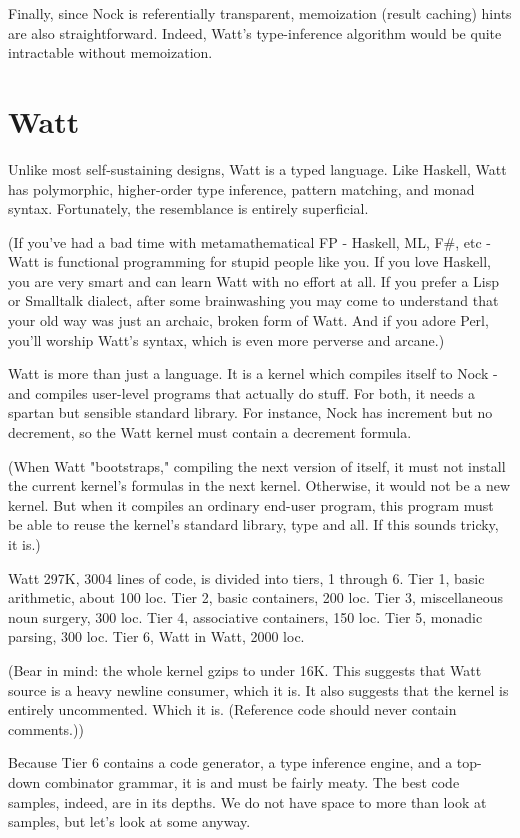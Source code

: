 \documentclass[10pt, nocopyrightspace]{sigplanconf}
\begin{document}
Finally, since Nock is referentially transparent, memoization
(result caching) hints are also straightforward.  Indeed, Watt's
type-inference algorithm would be quite intractable without
memoization.  

\section{Watt}

Unlike most self-sustaining designs, Watt is a typed language.
Like Haskell, Watt has polymorphic, higher-order type inference,
pattern matching, and monad syntax.  Fortunately, the resemblance
is entirely superficial.

(If you've had a bad time with metamathematical FP - Haskell, ML,
F\#, etc - Watt is functional programming for stupid people like
you.  If you love Haskell, you are very smart and can learn Watt
with no effort at all.  If you prefer a Lisp or Smalltalk
dialect, after some brainwashing you may come to understand that
your old way was just an archaic, broken form of Watt.  And if
you adore Perl, you'll worship Watt's syntax, which is even more
perverse and arcane.)

Watt is more than just a language.  It is a kernel which compiles
itself to Nock - and compiles user-level programs that actually
do stuff.  For both, it needs a spartan but sensible standard
library.  For instance, Nock has increment but no decrement, so
the Watt kernel must contain a decrement formula.

(When Watt "bootstraps," compiling the next version of itself, it
must not install the current kernel's formulas in the next
kernel.  Otherwise, it would not be a new kernel.  But when it
compiles an ordinary end-user program, this program must be able
to reuse the kernel's standard library, type and all.  If this
sounds tricky, it is.)

Watt 297K, 3004 lines of code, is divided into tiers, 1 through
6.  Tier 1, basic arithmetic, about 100 loc.  Tier 2, basic
containers, 200 loc.  Tier 3, miscellaneous noun surgery, 300
loc.  Tier 4, associative containers, 150 loc.  Tier 5, monadic 
parsing, 300 loc.  Tier 6, Watt in Watt, 2000 loc.

(Bear in mind: the whole kernel gzips to under 16K.  This
suggests that Watt source is a heavy newline consumer, which it
is.  It also suggests that the kernel is entirely uncommented.
Which it is.  (Reference code should never contain comments.))

Because Tier 6 contains a code generator, a type inference
engine, and a top-down combinator grammar, it is and must be
fairly meaty.  The best code samples, indeed, are in its depths.
We do not have space to more than look at samples, but let's look
at some anyway.
\end{document}

